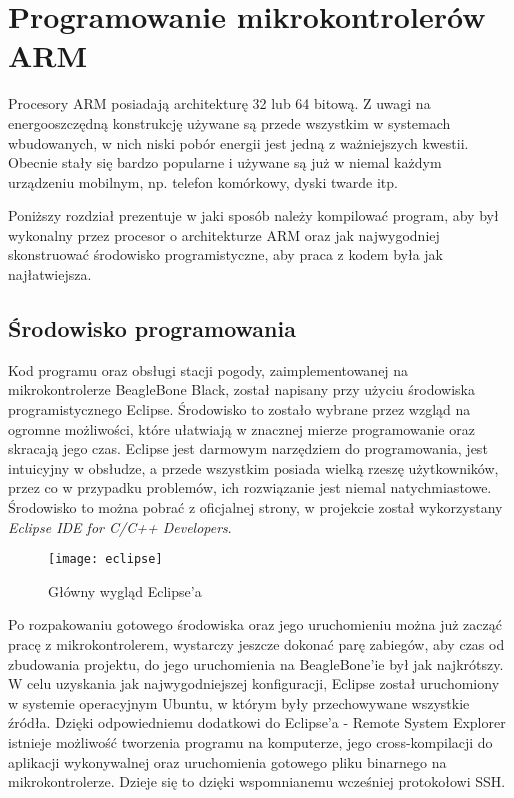 \chapter{Programowanie mikrokontrolerów ARM}
Procesory ARM posiadają architekturę 32 lub 64 bitową. Z uwagi na energooszczędną konstrukcję używane są przede wszystkim w systemach wbudowanych, w nich niski pobór energii jest jedną z ważniejszych kwestii. Obecnie stały się bardzo popularne i używane są już w niemal każdym urządzeniu mobilnym, np. telefon komórkowy, dyski twarde itp.

Poniższy rozdział prezentuje w jaki sposób należy kompilować program, aby był wykonalny przez procesor o architekturze ARM oraz jak najwygodniej skonstruować środowisko programistyczne, aby praca z kodem była jak najłatwiejsza.

\section{Środowisko programowania}
Kod programu oraz obsługi stacji pogody, zaimplementowanej na mikrokontrolerze BeagleBone Black, został napisany przy użyciu środowiska programistycznego Eclipse. Środowisko to zostało wybrane przez wzgląd na ogromne możliwości, które ułatwiają w znacznej mierze programowanie oraz skracają jego czas. Eclipse jest darmowym narzędziem do programowania, jest intuicyjny w obsłudze, a przede wszystkim posiada wielką rzeszę użytkowników, przez co w przypadku problemów, ich rozwiązanie jest niemal natychmiastowe. Środowisko to można pobrać z oficjalnej strony, w projekcie został wykorzystany \emph{Eclipse IDE for C/C++ Developers}.

\begin{figure}[h]
\centering
\texttt{[image: eclipse]}
\caption{Główny wygląd Eclipse'a}
\label{fig:eclipse}
\end{figure}

Po rozpakowaniu gotowego środowiska oraz jego uruchomieniu można już zacząć pracę z mikrokontrolerem, wystarczy jeszcze dokonać parę zabiegów, aby czas od zbudowania projektu, do jego uruchomienia na BeagleBone'ie był jak najkrótszy. W celu uzyskania jak najwygodniejszej konfiguracji, Eclipse został uruchomiony w systemie operacyjnym Ubuntu, w którym były przechowywane wszystkie źródła. Dzięki odpowiedniemu dodatkowi do Eclipse'a - Remote System Explorer istnieje możliwość tworzenia programu na komputerze, jego cross-kompilacji do aplikacji wykonywalnej oraz uruchomienia gotowego pliku binarnego na mikrokontrolerze. Dzieje się to dzięki wspomnianemu wcześniej protokołowi SSH.

